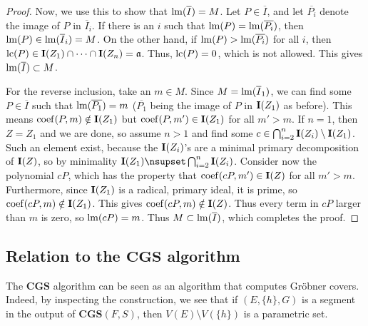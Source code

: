\begin{proof}
  Now, we use this to show that $\operatorname{lm}(\overline I) = M$. Let $P \in \overline I$, and let $\overline{P_{i}}$ denote the image of $P$ in $\overline I_{i}$. If there is an $i$ such that $\operatorname{lm}(P) = \operatorname{lm}(\overline{P_{i}})$, then $\operatorname{lm}(P) \in \operatorname{lm}(\overline I_{i}) = M$. On the other hand, if $\operatorname{lm}(P) > \operatorname{lm}(\overline{P_{i}})$ for all $i$, then $\operatorname{lc}(P) \in \operatorname{\mathbf I}(Z_{1}) \cap \dots \cap \operatorname{\mathbf I}(Z_{n}) = \mathfrak{a}$. Thus, $\operatorname{lc}(P) = 0$, which is not allowed. This gives $\operatorname{lm}(\overline I) \subset M$.

  For the reverse inclusion, take an $m \in M$. Since $M = \operatorname{lm}(\overline I_{1})$, we can find some $P \in \overline I$ such that $\operatorname{lm}(\overline{P_{1}}) = m$ ($\overline{P_{1}}$ being the image of $P$ in $\operatorname{\mathbf I}(Z_{1})$ as before). This means $\operatorname{coef}(P, m) \notin \operatorname{\mathbf I}(Z_{1})$ but $\operatorname{coef}(P, m') \in \operatorname{\mathbf I}(Z_{1})$ for all $m' > m$. If $n = 1$, then $Z = Z_{1}$ and we are done, so assume $n > 1$ and find some $c \in \bigcap_{i=2}^{n} \operatorname{\mathbf I}(Z_{i}) \setminus \operatorname{\mathbf I}(Z_{1})$. Such an element exist, because the $\operatorname{\mathbf I}(Z_{i})$'s are a minimal primary decomposition of $\operatorname{\mathbf I}(Z)$, so by minimality $\I(Z_{1}) \nsupset \bigcap_{i=2}^{n} \I(Z_{i})$. Consider now the polynomial $cP$, which has the property that $\operatorname{coef}(cP, m') \in \operatorname{\mathbf I}(Z)$ for all $m' > m$. Furthermore, since $\operatorname{\mathbf I}(Z_{1})$ is a radical, primary ideal, it is prime, so $\operatorname{coef}(cP, m) \notin \operatorname{\mathbf I}(Z_{1})$. This gives $\operatorname{coef}(cP, m) \notin \operatorname{\mathbf I}(Z)$. Thus every term in $cP$ larger than $m$ is zero, so $\operatorname{lm}(cP) = m$. Thus $M \subset \operatorname{lm}(\overline I)$, which completes the proof.
\end{proof}








\subsection{Relation to the $\mathbf{CGS}$ algorithm} \label{ss_covers}
The $\mathbf{CGS}$ algorithm can be seen as an algorithm that computes Gröbner covers. Indeed, by inspecting the construction, we see that if $(E, \{h\}, G)$ is a segment in the output of $\mathbf{CGS}(F, S)$, then $V(E)  \setminus V(\{h\})$ is a parametric set.

